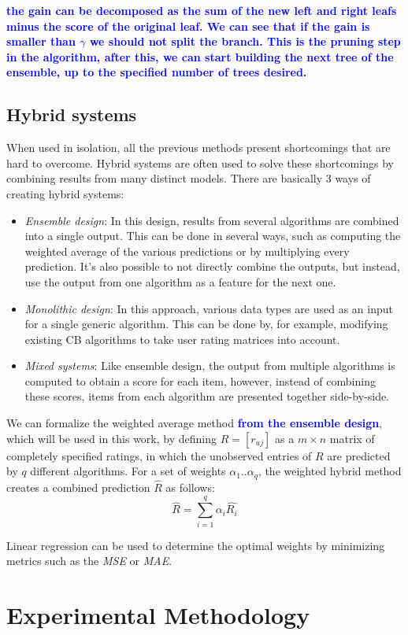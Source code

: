 \documentclass[cic,tc,english]{iiufrgs}
\newcommand{\adriano}[1]{\textcolor{blue}{\textbf{#1}}}
\begin{document}
\noindent \adriano{the gain can be decomposed as the sum of the new left and right leafs minus the score of the original leaf. We can see that if the gain is smaller than $\gamma$ we should not split the branch. This is the pruning step in the algorithm, after this, we can start building the next tree of the ensemble, up to the specified number of trees desired.}
\section{Hybrid systems}
When used in isolation, all the previous methods present shortcomings that are hard to overcome. Hybrid systems are often used to solve these shortcomings by combining results from many distinct models. There are basically 3 ways of creating hybrid systems:
\begin{itemize}
\item \emph{Ensemble design}: In this design, results from several algorithms are combined into a single output. This can be done in several ways, such as computing the weighted average of the various predictions or by multiplying every prediction. It's also possible to not directly combine the outputs, but instead, use the output from one algorithm as a feature for the next one.
\item \emph{Monolithic design}: In this approach, various data types are used as an input for a single generic algorithm. This can be done by, for example, modifying existing CB algorithms to take user rating matrices into account.
\item \emph{Mixed systems}: Like ensemble design, the output from multiple algorithms is computed to obtain a score for each item, however, instead of combining these scores, items from each algorithm are presented together side-by-side.
\end{itemize}

We can formalize the weighted average method \adriano{from the ensemble design}, which will be used in this work, by defining $R = [r_{uj}]$ as a $m \times n$ matrix of completely specified ratings, in which the unobserved entries of $R$ are predicted by $q$ different algorithms. For a set of weights $\alpha_1 .. \alpha_q$, the weighted hybrid method creates a combined prediction $\hat{R}$ as follows:
$$
\hat{R} = \sum_{i=1}^{q}{\alpha_i\hat{R_i}}
$$

Linear regression can be used to determine the optimal weights by minimizing metrics such as the \emph{MSE} or \emph{MAE}.


\chapter{Experimental Methodology} \label{experiment}
\end{document}
